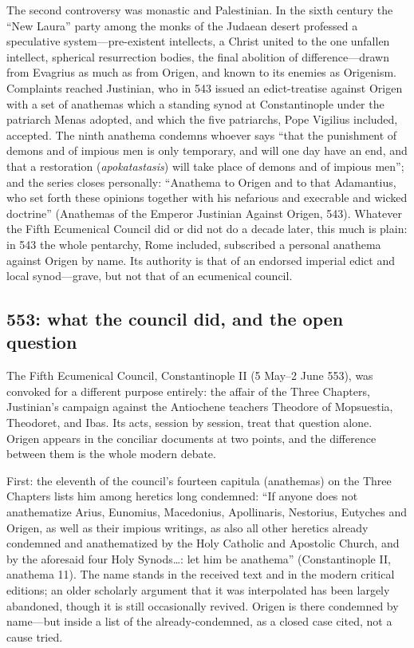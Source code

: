 The second controversy was monastic and Palestinian. In the sixth century
the ``New Laura'' party among the monks of the Judaean desert professed a
speculative system---pre-existent intellects, a Christ united to the one
unfallen intellect, spherical resurrection bodies, the final abolition of
difference---drawn from Evagrius as much as from Origen, and known to its
enemies as Origenism. Complaints reached Justinian, who in 543 issued an
edict-treatise against Origen with a set of anathemas which a standing
synod at Constantinople under the patriarch Menas adopted, and which the
five patriarchs, Pope Vigilius included, accepted. The ninth anathema
condemns whoever says ``that the punishment of demons and of impious men is
only temporary, and will one day have an end, and that a restoration
(\textit{apokatastasis}) will take place of demons and of impious men'';
and the series closes personally: ``Anathema to Origen and to that
Adamantius, who set forth these opinions together with his nefarious and
execrable and wicked doctrine'' (Anathemas of the Emperor Justinian Against
Origen, 543). Whatever the Fifth Ecumenical Council did or did not do a
decade later, this much is plain: in 543 the whole pentarchy, Rome
included, subscribed a personal anathema against Origen by name. Its
authority is that of an endorsed imperial edict and local synod---grave,
but not that of an ecumenical council.

\subsection{553: what the council did, and the open question}

The Fifth Ecumenical Council, Constantinople II (5 May--2 June 553), was
convoked for a different purpose entirely: the affair of the Three
Chapters, Justinian's campaign against the Antiochene teachers Theodore of
Mopsuestia, Theodoret, and Ibas. Its acts, session by session, treat that
question alone. Origen appears in the conciliar documents at two points,
and the difference between them is the whole modern debate.

First: the eleventh of the council's fourteen capitula (anathemas) on the
Three Chapters lists him among heretics long condemned: ``If anyone does
not anathematize Arius, Eunomius, Macedonius, Apollinaris, Nestorius,
Eutyches and Origen, as well as their impious writings, as also all other
heretics already condemned and anathematized by the Holy Catholic and
Apostolic Church, and by the aforesaid four Holy Synods\ldots: let him be
anathema'' (Constantinople II, anathema 11). The name stands in the
received text and in the modern critical editions; an older scholarly
argument that it was interpolated has been largely abandoned, though it is
still occasionally revived. Origen is there condemned by name---but inside
a list of the already-condemned, as a closed case cited, not a cause tried.

